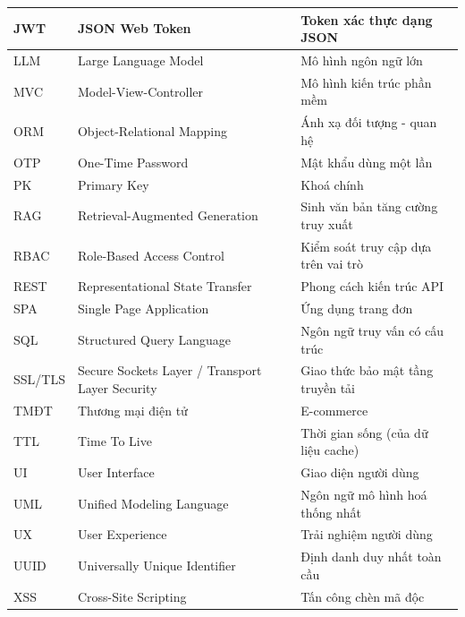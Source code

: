 \begin{longtable}{|m{2.2cm}|m{5.5cm}|m{6.0cm}|}
JWT & JSON Web Token & Token xác thực dạng JSON \\ \hline
LLM & Large Language Model & Mô hình ngôn ngữ lớn \\ \hline
MVC & Model-View-Controller & Mô hình kiến trúc phần mềm \\ \hline
ORM & Object-Relational Mapping & Ánh xạ đối tượng - quan hệ \\ \hline
OTP & One-Time Password & Mật khẩu dùng một lần \\ \hline
PK & Primary Key & Khoá chính \\ \hline
RAG & Retrieval-Augmented Generation & Sinh văn bản tăng cường truy xuất \\ \hline
RBAC & Role-Based Access Control & Kiểm soát truy cập dựa trên vai trò \\ \hline
REST & Representational State Transfer & Phong cách kiến trúc API \\ \hline
SPA & Single Page Application & Ứng dụng trang đơn \\ \hline
SQL & Structured Query Language & Ngôn ngữ truy vấn có cấu trúc \\ \hline
SSL/TLS & Secure Sockets Layer / Transport Layer Security & Giao thức bảo mật tầng truyền tải \\ \hline
TMĐT & Thương mại điện tử & E-commerce \\ \hline
TTL & Time To Live & Thời gian sống (của dữ liệu cache) \\ \hline
UI & User Interface & Giao diện người dùng \\ \hline
UML & Unified Modeling Language & Ngôn ngữ mô hình hoá thống nhất \\ \hline
UX & User Experience & Trải nghiệm người dùng \\ \hline
UUID & Universally Unique Identifier & Định danh duy nhất toàn cầu \\ \hline
XSS & Cross-Site Scripting & Tấn công chèn mã độc \\ \hline
\end{longtable}
